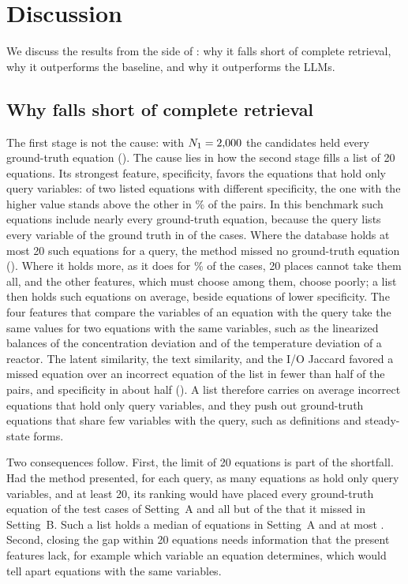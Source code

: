 \section{Discussion}\label{sec:discussion}

We discuss the results from the side of \ours{}: why it falls short of complete
retrieval, why it outperforms the baseline, and why it outperforms the LLMs.

\subsection{Why \ours{} falls short of complete retrieval}\label{sec:whynot}

The first stage is not the cause: with $N_1 = 2{,}000$ the candidates held every ground-truth
equation (). The cause lies in how the second stage fills a list of
20 equations. Its strongest feature, specificity, favors the equations that hold only query
variables: of two listed equations with different specificity, the one with the higher value stands
above the other in \PctPairsInOrderA\% of the pairs. In this benchmark such equations include
nearly every ground-truth equation, because the query lists every variable of the ground truth in
\NReqThreeTrivial{} of the \NCases{} cases. Where the database holds at most 20 such equations for
a query, the method missed no ground-truth equation (). Where it holds
more, as it does for \PctCovOverA\% of the cases, 20 places cannot take them all, and the other
features, which must choose among them, choose poorly; a list then holds \NOneInListOverA{} such
equations on average, beside equations of lower specificity. The four features that compare the variables of an
equation with the query take the same values for two equations with the same variables, such as
the linearized balances of the concentration deviation and of the temperature deviation of a
reactor. The latent similarity, the text similarity, and the I/O Jaccard favored a missed
equation over an incorrect equation of the list in fewer than half of the pairs, and specificity
in about half (). A list therefore carries on average
\CompCoveredAProp{} incorrect equations that hold only query variables, and they push out
ground-truth equations that share few variables with the query, such as definitions and
steady-state forms.

Two consequences follow. First, the limit of 20 equations is part of the shortfall. Had the method
presented, for each query, as many equations as hold only query variables, and at least 20, its
ranking would have placed every ground-truth equation of the test cases of Setting~A and all but
\NMissedExtendedB{} of the \NMissedTwentyB{} that it missed in Setting~B. Such a list holds a
median of \LenExtendedMedianA{} equations in Setting~A and at most \LenExtendedMaxA. Second,
closing the gap within 20 equations needs information that the present features lack, for example
which variable an equation determines, which would tell apart equations with the same variables.


